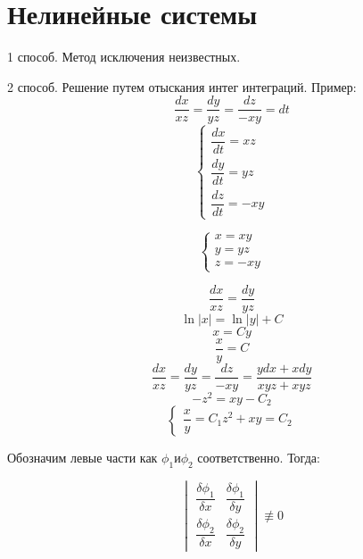 \section*{Нелинейные системы}
1 способ. Метод исключения неизвестных. \par
2 способ. Решение путем отыскания интег интеграций. Пример:
$$ \dfrac{dx}{xz} = \dfrac{dy}{yz} = \dfrac{dz}{-xy} = dt $$
$$ \begin{cases}
        \dfrac{dx}{dt} = xz \\
        \dfrac{dy}{dt} = yz \\
        \dfrac{dz}{dt} = -xy
    \end{cases} $$

$$ \begin{cases}
        x = xy \\
        y = yz \\
        z = -xy
    \end{cases} $$

$$ \dfrac{dx}{xz} = \dfrac{dy}{yz} $$
$$ \ln{|x|} = \ln{|y|} + C $$
$$ x = Cy $$
$$ \dfrac{x}{y} = C $$
$$ \dfrac{dx}{xz} = \dfrac{dy}{yz} = \dfrac{dz}{-xy} = \dfrac{ydx + xdy}{xyz + xyz} $$
$$ -z^2 = xy - C _2 $$
$$
    \begin{cases}
        \dfrac{x}{y} = C_1 
        z^2 + xy = C_2 
    \end{cases}
$$

Обозначим левые части как $ \phi_1 и \phi_2 $ соответственно. Тогда:

$$
    \begin{vmatrix}
        \dfrac{\delta \phi_1}{\delta x} & \dfrac{\delta \phi_1}{\delta y} \\
        \dfrac{\delta \phi_2}{\delta x} & \dfrac{\delta \phi_2}{\delta y}
    \end{vmatrix} \not\equiv 0
$$



